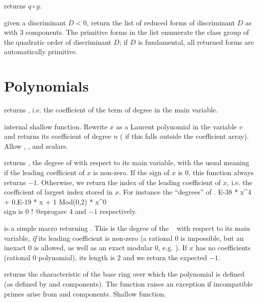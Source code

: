  returns $q \circ g$.

 given a discriminant $D < 0$, return the list
of reduced forms of discriminant $D$ as  with 3 components.
The primitive forms in the list enumerate the class group of the quadratic
order of discriminant $D$; if $D$ is fundamental, all returned forms
are automatically primitive.

\section{Polynomials}\label{se:polynomials}

 returns , i.e.
the coefficient of the term of degree  in the main variable.

 internal shallow function. Rewrite
$x$ as a Laurent polynomial in the variable $v$ and returns its coefficient
of degree $n$ ( if this falls outside the coefficient array).
Allow , ,  and scalars.

 returns , the degree of
 with respect to its main variable, with the usual meaning if the
leading coefficient of $x$ is non-zero. If the sign of $x$ is $0$, this
function always returns $-1$. Otherwise, we return the index of the leading
coefficient of $x$, i.e. the coefficient of largest index stored in $x$.
For instance the ``degrees'' of
. E-38 * x^4 + 0.E-19 * x + 1
  Mod(0,2) * x^0    \\ sign is 0 !
@eprog\noindent are $4$ and $-1$ respectively.

 is a simple macro returning .
This is the degree of the ~ with respect to its main
variable, \emph{if} its leading coefficient is non-zero (a rational $0$ is
impossible, but an inexact $0$ is allowed, as well as an exact modular $0$,
e.g. ). If $x$ has no coefficients (rational $0$ polynomial),
its length is $2$ and we return the expected $-1$.

 returns the characteristic of the
base ring over which the polynomial is defined (as defined by 
and  components). The function raises an exception if incompatible
primes arise from  and  components. Shallow function.

